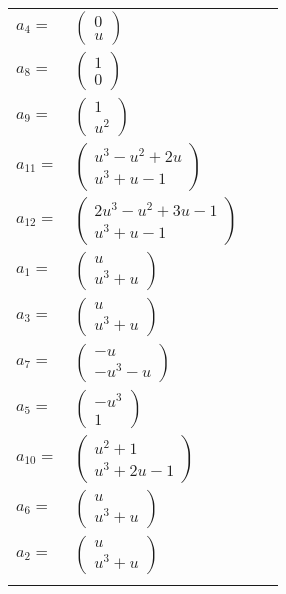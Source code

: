 \documentclass[1p]{elsarticle_modified}
\theoremstyle{definition}
\begin{document}
\begin{tabular}{m{7pt} m{180pt} m{7pt} m{180pt} }
\flushright $a_{4}=$&$\begin{pmatrix}0\\u\end{pmatrix}$ \\
\flushright $a_{8}=$&$\begin{pmatrix}1\\0\end{pmatrix}$ \\
\flushright $a_{9}=$&$\begin{pmatrix}1\\u^2\end{pmatrix}$ \\
\flushright $a_{11}=$&$\begin{pmatrix}u^3- u^2+2 u\\u^3+u-1\end{pmatrix}$ \\
\flushright $a_{12}=$&$\begin{pmatrix}2 u^3- u^2+3 u-1\\u^3+u-1\end{pmatrix}$ \\
\flushright $a_{1}=$&$\begin{pmatrix}u\\u^3+u\end{pmatrix}$ \\
\flushright $a_{3}=$&$\begin{pmatrix}u\\u^3+u\end{pmatrix}$ \\
\flushright $a_{7}=$&$\begin{pmatrix}- u\\- u^3- u\end{pmatrix}$ \\
\flushright $a_{5}=$&$\begin{pmatrix}- u^3\\1\end{pmatrix}$ \\
\flushright $a_{10}=$&$\begin{pmatrix}u^2+1\\u^3+2 u-1\end{pmatrix}$ \\
\flushright $a_{6}=$&$\begin{pmatrix}u\\u^3+u\end{pmatrix}$ \\
\flushright $a_{2}=$&$\begin{pmatrix}u\\u^3+u\end{pmatrix}$\\&\end{tabular}
\end{document}
